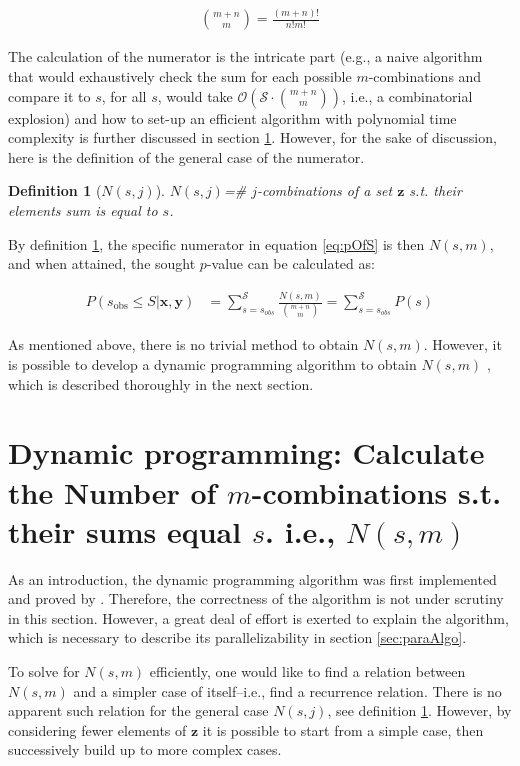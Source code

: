 \documentclass[a4paper,11pt]{article}
\newtheorem{mydef}{Definition}
\begin{document}
\begin{align*}
{m+n \choose m} = \frac{(m+n)!}{n!m!}
\end{align*}

The calculation of the numerator is the intricate part (e.g., a naive algorithm that would exhaustively check the sum for each possible $m$-combinations and compare it to $s$, for all $s$, would take $\mathcal{O}(\mathcal{S} \cdot {m+n \choose m})$, i.e., a combinatorial explosion) and how to set-up an efficient algorithm with polynomial time complexity is further discussed in section \ref{sec:calcBottleneck}. However, for the sake of discussion, here is the definition of the general case of the numerator.
\begin{mydef}[$N(s,j)$]
\label{def:numerator}
$N(s,j)$=\# $j$-combinations of a set $\bm{z}$ s.t. their elements sum is equal to $s$.
\end{mydef}

By definition \ref{def:numerator}, the specific numerator in equation \ref{eq:pOfS} is then $N(s,m)$, and when attained, the sought $p$-value can be calculated as:

\begin{align}
P(s_{\text{obs}} \leq S | \bm{x}, \bm{y}) &= \sum _{s=s_{obs}}^{\mathcal{S}}\frac{N(s,m)}{{m+n \choose m}}=\sum _{s=s_{obs}}^{\mathcal{S}}P(s)
\end{align}

As mentioned above, there is no trivial method to obtain $N(s,m)$. However, it is possible to develop a  dynamic programming algorithm to obtain $N(s,m)$ \cite{pagano_trichtler1983, zimmermann1985}, which is described thoroughly in the next section.

\section{Dynamic programming: Calculate the Number of $m$-combinations s.t. their sums equal $s$. i.e., $N(s,m)$}
\label{sec:calcBottleneck}

As an introduction, the dynamic programming algorithm was first implemented and proved by \cite{zimmermann1985, pagano_trichtler1983}. Therefore, the correctness of the algorithm is not under scrutiny in this section. However, a great deal of effort is exerted to explain the algorithm, which is necessary to describe its parallelizability in section \ref{sec:paraAlgo}.

To solve for $N(s,m)$ efficiently, one would like to find a relation between $N(s,m)$ and a simpler case of itself–i.e., find a recurrence relation. There is no apparent such relation for the general case $N(s,j)$, see definition \ref{def:numerator}. However, by considering fewer elements of $\bm{z}$ it is possible to start from a simple case, then successively build up to more complex cases.
\end{document}
